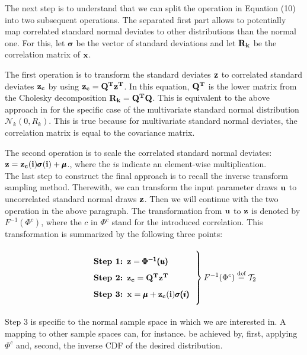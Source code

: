 \documentclass[a4paper,12pt]{article}
\newcommand*{\defeq}{\stackrel{\text{def}}{=}}
\begin{document}
\noindent
The next step is to understand that we can split the operation in Equation (10) into two subsequent operations. The separated first part allows to potentially map correlated standard normal deviates to other distributions than the normal one. For this, let $\pmb{\sigma}$ be the vector of standard deviations and let $\bold{R_k}$ be the correlation matrix of $\bold{x}$.

The first operation is to transform the standard deviates $\bold{z}$ to correlated standard deviates $\bold{z_c}$ by using $\bold{z_c}=\bold{Q^T z^T}$. In this equation, $\bold{Q^T}$ is the lower matrix from the Cholesky decomposition $\bold{R_k}=\bold{Q^T Q}$. This is equivalent to the above approach in \cite{gentle2006random} for the specific case of the multivariate standard normal distribution $\mathcal{N}_k(0, R_k)$. This is true because for multivariate standard normal deviates, the correlation matrix is equal to the covariance matrix.

The second operation is to scale the correlated standard normal deviates: $\bold{z}=\bold{z_c(i)}\pmb{\sigma}\bold{(i)} + \pmb{\mu}$., where the $i$s indicate an element-wise multiplication.\\

\noindent
The last step to construct the final approach is to recall the inverse transform sampling method. Therewith, we can transform the input parameter draws $\bold{u}$ to uncorrelated standard normal draws $\bold{z}$. Then we will continue with the two operation in the above paragraph. The transformation from $\bold{u}$ to $\bold{z}$ is denoted by $ F^{-1}(\Phi^c)$, where the $c$ in  $\Phi^c$ stand for the introduced correlation. This transformation is summarized by the following three points:


\[
\left.\parbox{0.5\textwidth}{%
\begin{enumerate}[label=\bfseries Step \arabic*:,leftmargin=*,labelindent=5em]
	\item $\bold{z} = \pmb{\Phi^{-1}({u})}$
    \item $\bold{z_c} = \bold{Q^T z^T}$
    \item $\bold{x} = \pmb{\mu} + \bold{z_c(i)}\pmb{\sigma(i)}$
\end{enumerate}
}\right\}F^{-1}(\Phi^c) \defeq \mathcal{T}_2
\]

\noindent
Step 3 is specific to the normal sample space in which we are interested in. A mapping to other sample spaces can, for instance. be achieved by, first, applying $\Phi^c$ and, second, the inverse CDF of the desired distribution.
\end{document}
